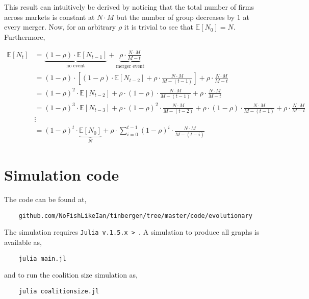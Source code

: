 \documentclass[american]{scrartcl}
\newcommand{\E}{\mathbb{E}}
\begin{document}
This result can intuitively be derived by noticing that the total number of firms across markets is constant at $N \cdot M$ but the number of group decreases by $1$ at every merger. Now, for an arbitrary $\rho$ it is trivial to see that $\E[N_0] = N$. Furthermore,

\begin{equation*}
    \begin{split}
        \E[N_t] &= \underbrace{(1 - \rho) \cdot \E[N_{t-1}]}_{\text{no event}} + \underbrace{\rho \cdot \frac{N \cdot M}{M-t}}_{\text{merger event}} \\
        &= (1 - \rho) \cdot \left[ (1 - \rho) \cdot \E[N_{t-2}] + \rho \cdot \frac{N \cdot M}{M - (t-1)} \right] + \rho \cdot \frac{N \cdot M}{M-t} \\
        &=(1 - \rho)^2 \cdot  \E[N_{t-2}] + \rho \cdot (1 - \rho) \cdot \frac{N \cdot M}{M - (t - 1)} + \rho \cdot \frac{N\cdot M}{M-t} \\
        &= (1 - \rho)^3 \cdot  \E[N_{t-3}] + \rho \cdot (1 - \rho)^2 \cdot \frac{N \cdot M}{M - (t - 2)} + \rho \cdot (1 - \rho) \cdot \frac{N \cdot M}{M - (t - 1)} + \rho \cdot \frac{N\cdot M}{M-t}  \\
        &\vdots \\
        &= (1 - \rho)^t \cdot \underbrace{\E[N_0]}_{N} + \rho \cdot \sum^{t-1}_{i = 0} (1 - \rho)^{i} \cdot \frac{N \cdot M}{M - (t - i)}
    \end{split}
\end{equation*}


\section{Simulation code} \label{A:code}

The code can be found at,

\begin{verbatim}
    github.com/NoFishLikeIan/tinbergen/tree/master/code/evolutionary
\end{verbatim}

The simulation requires \verb+Julia v.1.5.x > +. A simulation to produce all graphs is available as,

\begin{verbatim}
    julia main.jl
\end{verbatim}

and to run the coalition size simulation as,

\begin{verbatim}
    julia coalitionsize.jl
\end{verbatim}
\end{document}
